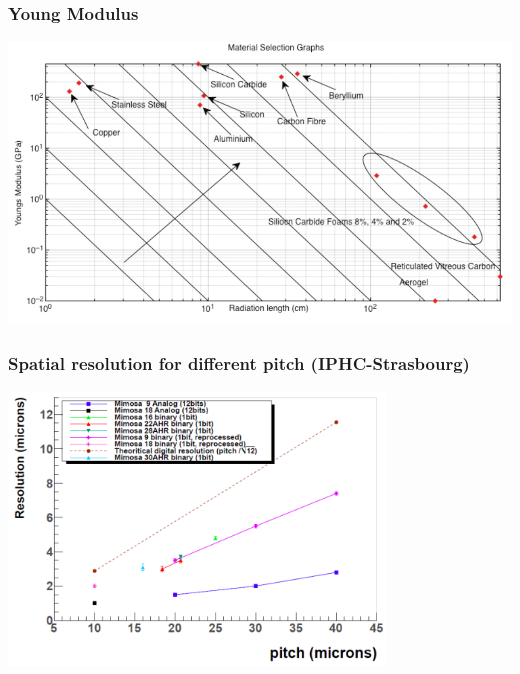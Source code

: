 \documentclass{beamer}
\begin{document}
  \begin{frame}[plain]
    \frametitle{Young Modulus}

    \begin{center}
      \includegraphics[width = \textwidth]{Pictures/youngModulus_vs_radiationLength-004.jpg}
    \end{center}
  \end{frame}

  \begin{frame}[plain]
    \frametitle{Spatial resolution for different pitch (IPHC-Strasbourg)}

    \vspace{-0.3cm}
    \begin{center}
        \includegraphics[width = 10cm]{Pictures/resolution_pitch_10to40_withBinary.png}
    \end{center}
  \end{frame}

\end{document}
